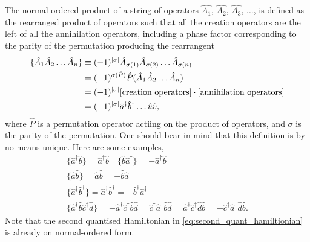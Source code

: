         The normal-ordered product of a string of operators $\hat{A_1}$, $\hat{A_2}$,
        $\hat{A_3}$, $\dots$, is defined as the rearranged product of operators such 
        that all the creation operators are the left of all the annihilation
        operators, including a phase factor corresponding to the parity of the
        permutation producing the rearrangent
        \begin{equation} 
            \begin{aligned}
            \{\hat{A}_1\hat{A}_2 \dots \hat{A}_n \} 
            &\equiv (-1)^{\abs{\sigma}}
                \hat{A}_{\sigma(1)}\hat{A}_{\sigma(2)} \dots \hat{A}_{\sigma(n)} \\
            &= (-1)^{\sigma(\hat{P})}\hat{P}(\hat{A}_1\hat{A}_2 \dots \hat{A}_n) \\
            &= (-1)^{\abs{\sigma}}
            [\text{creation operators}] \cdot [\text{annihilation operators}] \\
            &= (-1)^{\abs{\sigma}}\hat{a}^\dagger \hat{b}^\dagger \dots \hat{u} \hat{v},
            \end{aligned}
        \end{equation}
        where $\hat{P}$ is a permutation operator actiing on the product of operators, 
        and $\sigma$ is the parity of the permutation. One should bear in mind that this 
        definition is by no means unique. Here are some examples,
        \begin{gather*}
            \{\hat{a}^\dagger \hat{b}\} = \hat{a}^\dagger \hat{b} \quad
            \{\hat{b} \hat{a}^\dagger\} = -\hat{a}^\dagger \hat{b} \\
            \{\hat{a} \hat{b} \} = \hat{a} \hat{b} = - \hat{b} \hat{a} \\
            \{\hat{a}^\dagger\hat{b}^\dagger \} 
                = \hat{a}^\dagger \hat{b}^\dagger 
                = -\hat{b}^\dagger \hat{a}^\dagger \\
            \{\hat{a}^\dagger \hat{b} \hat{c}^\dagger \hat{d}\}
                = -\hat{a}^\dagger \hat{c}^\dagger\hat{b} \hat{d} 
                = \hat{c}^\dagger \hat{a}^\dagger\hat{b} \hat{d} 
                = \hat{a}^\dagger \hat{c}^\dagger\hat{d} \hat{b} 
                = -\hat{c}^\dagger \hat{a}^\dagger\hat{d} \hat{b}.
        \end{gather*}
        Note that the second quantised Hamiltonian in \autoref{eq:second_quant_hamiltionian}
        is already on normal-ordered form.

